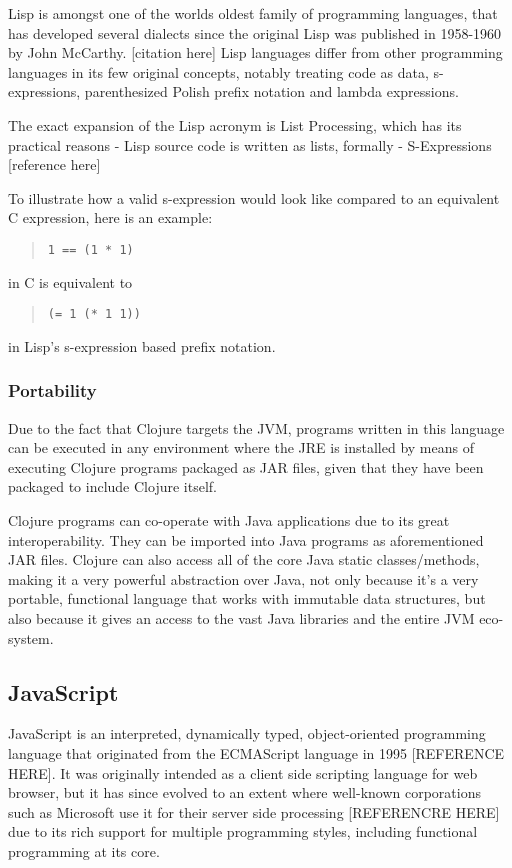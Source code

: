 Lisp is amongst one of the worlds oldest family of programming languages, that has developed several dialects since the original Lisp was published in 1958-1960 by John McCarthy. [citation here]
Lisp languages differ from other programming languages in its few original concepts, notably treating code as data, s-expressions, parenthesized Polish prefix notation and lambda expressions.

The exact expansion of the Lisp acronym is List Processing, which has its practical reasons - Lisp source code is written as lists, formally - S-Expressions [reference here]

To illustrate how a valid s-expression would look like compared to an equivalent C expression, here is an example:

\begin{quote}
\begin{verbatim}
1 == (1 * 1)
\end{verbatim}
\end{quote}
in C is equivalent to

\begin{quote}
\begin{verbatim}
(= 1 (* 1 1))
\end{verbatim}
\end{quote}
in Lisp's s-expression based prefix notation.

\subsubsection{Portability}
Due to the fact that Clojure targets the JVM, programs written in this language can be executed in any environment where the JRE is installed by means of executing Clojure programs packaged as JAR files, given that they have been packaged to include Clojure itself.  

Clojure programs can co-operate with Java applications due to its great interoperability. They can be imported into Java programs as aforementioned JAR files.
Clojure can also access all of the core Java static classes/methods, making it a very powerful abstraction over Java, not only because it's a very portable, functional language that works with immutable data structures, but also because it gives an access to the vast Java libraries and the entire JVM eco-system.

\subsection{JavaScript}
JavaScript is an interpreted, dynamically typed, object-oriented programming language that originated from the ECMAScript language in 1995 [REFERENCE HERE]. It was originally intended as a client side scripting language for web browser, but it has since evolved to an extent where well-known corporations such as Microsoft use it for their server side processing [REFERENCRE HERE] due to its rich support for multiple programming styles, including functional programming at its core.

